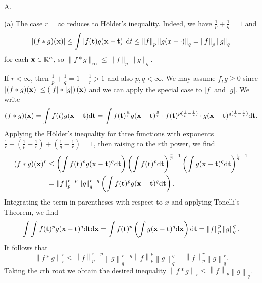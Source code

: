\begin{lemma}
  A.
\end{lemma}

\begin{exercise}{9.2}
  (a) The case $r = \infty$ reduces to H\"{o}lder's inequality.
  Indeed, we have $\frac{1}{p} + \frac{1}{q} = 1$ and
  \[
    \left| (f * g)(\mathbf{x}) \right| \le \int \left| f(\mathbf{t}) g(\mathbf{x}-\mathbf{t}) \right| \mathrm{d} t
    \le \left\| f \right\|_p \left\| g(x-\cdot) \right\|_q
    = \left\| f \right\|_p \left\| g \right\|_q
  \]
  for each $\mathbf{x} \in \mathbb{R}^n$, so $\| f*g \|_{\infty} \le \|f\|_p \|g\|_q$.

  If $r < \infty$,
  then $\frac{1}{p} + \frac{1}{q} = 1 + \frac{1}{r} > 1$
  and also $p, q < \infty$.
  We may assume $f, g \ge 0$ since
  $\left| (f*g)(\mathbf{x}) \right| \le \left( |f|*|g| \right) (\mathbf{x})$
  and we can apply the special case to $|f|$ and $|g|$.
  We write
  \[
    (f*g)(\mathbf{x}) = \int f(t) g(\mathbf{x}-\mathbf{t}) \mathrm{d} \mathbf{t}
    = \int f(\mathbf{t})^{\frac{p}{r}} g(\mathbf{x}-\mathbf{t})^{\frac{q}{r}}
    \cdot f(\mathbf{t})^{p(\frac1p - \frac1r)}
    \cdot g(\mathbf{x} - \mathbf{t})^{q(\frac1q - \frac1r)} \mathrm{d} \mathbf{t}.
  \]
  Applying the H\"{o}lder's inequality for three functions
  with exponents
  $\frac{1}{r} + (\frac{1}{p} - \frac{1}{r})
  + (\frac{1}{q} - \frac{1}{r}) = 1$,
  then raising to the $r$th power,
  we find
  \[
    \begin{aligned}
    (f*g)(\mathbf{x})^r
    &\le
    \left( \int f(\mathbf{t})^p g(\mathbf{x}-\mathbf{t})^q \mathrm{d} \mathbf{t} \right)
    \left( \int f(\mathbf{t})^p \mathrm{d} \mathbf{t} \right)^{\frac rp - 1}
    \left( \int g(\mathbf{x}-\mathbf{t})^q \mathrm{d} \mathbf{t} \right)^{\frac rq - 1} \\
    &= \left\| f \right\|_p^{r-p} \left\| g \right\|_{q}^{r-q}
      \left( \int f(\mathbf{t})^p g(\mathbf{x}-\mathbf{t})^q \mathrm{d} \mathbf{t} \right).
    \end{aligned}
  \]
  Integrating the term in parentheses with respect to $x$
  and applying Tonelli's Theorem, we find
  \[
    \int \int f(\mathbf{t})^p g(\mathbf{x}-\mathbf{t})^q \mathrm{d} \mathbf{t} \mathrm{d} \mathbf{x}
    = \int f(\mathbf{t})^p \left( \int g(\mathbf{x}-\mathbf{t})^q \mathrm{d} \mathbf{x} \right) \mathrm{d} \mathbf{t}
    = \left\| f \right\|_p^p \left\| g \right\|_q^q.
  \]
  It follows that
  \[
    \left\| f*g \right\|_r^r \le
    \left\| f \right\|_p^{r-p} \left\| g \right\|_{q}^{r-q}
    \left\| f \right\|_p^p \left\| g \right\|_q^q
    = \left\| f \right\|_p^r \left\| g \right\|_q^r.
  \]
  Taking the $r$th root we obtain the desired inequality
  $\left\| f*g \right\|_r \le \left\| f \right\|_p \left\| g \right\|_q$.


\end{exercise}
